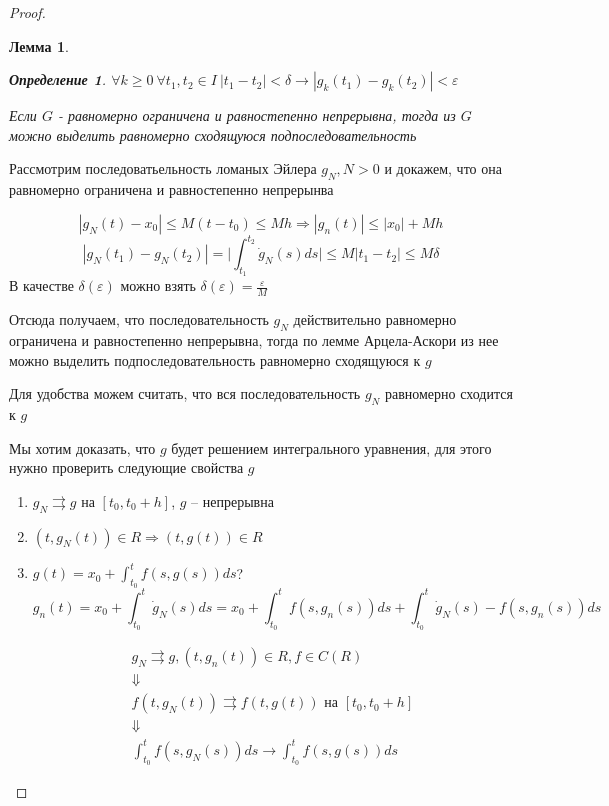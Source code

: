 \documentclass[a4paper]{article}
\theoremstyle{indented}
\newtheorem*{lemma}{Лемма}
\theoremstyle{definition}
\newtheorem*{defn}{Определение}
\theoremstyle{remark}
\begin{document}
\begin{proof}
\begin{lemma}
\begin{defn}
      $\forall k \geqslant 0 \ \forall t_1, t_2 \in I \ |t_1 - t_2| < \delta \rightarrow |g_k(t_1)- g_k(t_2)| < \varepsilon $
    \end{defn}

    Если $G$ - равномерно ограничена и равностепенно непрерывна, тогда из $G$ можно выделить равномерно сходящуюся подпоследовательность
  \end{lemma}
  
  Рассмотрим последоватьельность ломаных Эйлера $g_N, N > 0$ и докажем, что она равномерно ограничена и равностепенно непрерынва

  \[|g_N(t) - x_0| \leqslant M(t-t_0) \leqslant Mh \Rightarrow |g_n(t)| \leqslant |x_0| + Mh \]
  \[|g_N(t_1) - g_N(t_2)| = \bigg|\int_{t_1}^{t_2}\dot g_N(s)ds \bigg| \leqslant M|t_1 - t_2|  \leqslant M\delta\]
  В качестве $\delta(\varepsilon)$ можно взять $\delta(\varepsilon ) = \frac{\varepsilon}{M}$

  Отсюда получаем, что последовательность $g_N$ действительно равномерно ограничена и равностепенно непрерывна, тогда по лемме Арцела-Аскори из нее можно выделить подпоследовательность равномерно сходящуюся к $g$

  Для удобства можем считать, что вся последовательность $g_N$ равномерно сходится к $g$

  Мы хотим доказать, что $g$ будет решением интегрального уравнения, для этого нужно проверить следующие свойства $g$
  \begin{enumerate}
  \item 
    $g_N \rightrightarrows g$ на $[t_0,t_0+h]$, $g$ -- непрерывна

  \item   $(t,g_N(t)) \in R \Rightarrow (t,g(t)) \in R$

  \item $g(t) = x_0 + \int_{t_0}^{t}f(s,g(s))ds$?
    \[g_n(t) = x_0 + \int_{t_0}^{t}\dot g_N(s) ds = x_0 + \int_{t_0}^{t}f(s,g_n(s))ds + \int_{t_0}^{t}\dot g_N(s) - f(s,g_n(s)) ds\]

    \begin{equation*}
      \begin{gathered}
        g_N \rightrightarrows g, (t,g_n(t)) \in R, f \in C(R)\\
        \Downarrow \\
        f(t,g_N(t)) \rightrightarrows f(t,g(t)) \text{ на } [t_0,t_0 + h] \\
        \Downarrow \\
        \int_{t_0}^{t}f(s,g_N(s)) ds \rightarrow \int_{t_0}^{t}f(s,g(s))ds
      \end{gathered}
    \end{equation*}


\end{enumerate}
\end{proof}
\end{document}

